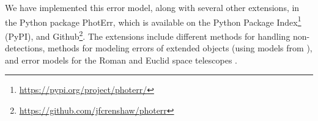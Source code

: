 \documentclass[twocolumn,twocolappendix]{aastex631}
\begin{document}
We have implemented this error model, along with several other extensions, in the Python package PhotErr, which is available on the Python Package Index\footnote{\url{https://pypi.org/project/photerr/}} (PyPI), and Github\footnote{\url{https://github.com/jfcrenshaw/photerr}}.
The extensions include different methods for handling non-detections, methods for modeling errors of extended objects (using models from \citealt{vandenbusch2020,kuijken2019}), and error models for the Roman and Euclid space telescopes \citep{roman,euclid,graham2020}.




\end{document}
